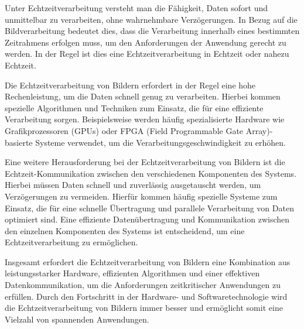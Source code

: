     Unter Echtzeitverarbeitung versteht man die Fähigkeit, Daten sofort und unmittelbar zu verarbeiten, ohne wahrnehmbare Verzögerungen.
    In Bezug auf die Bildverarbeitung bedeutet dies, dass die Verarbeitung innerhalb eines bestimmten Zeitrahmens erfolgen muss, um den Anforderungen der Anwendung gerecht zu werden.
    In der Regel ist dies eine Echtzeitverarbeitung in Echtzeit oder nahezu Echtzeit.
    
    Die Echtzeitverarbeitung von Bildern erfordert in der Regel eine hohe Rechenleistung, um die Daten schnell genug zu verarbeiten.
    Hierbei kommen spezielle Algorithmen und Techniken zum Einsatz, die für eine effiziente Verarbeitung sorgen.
    Beispielsweise werden häufig spezialisierte Hardware wie Grafikprozessoren (GPUs) oder FPGA (Field Programmable Gate Array)-basierte Systeme verwendet, um die Verarbeitungsgeschwindigkeit zu erhöhen.
    
    Eine weitere Herausforderung bei der Echtzeitverarbeitung von Bildern ist die Echtzeit-Kommunikation zwischen den verschiedenen Komponenten des Systems.
    Hierbei müssen Daten schnell und zuverlässig ausgetauscht werden, um Verzögerungen zu vermeiden. Hierfür kommen häufig spezielle Systeme zum Einsatz, die für eine schnelle Übertragung und parallele Verarbeitung von Daten optimiert sind.
    Eine effiziente Datenübertragung und Kommunikation zwischen den einzelnen Komponenten des Systems ist entscheidend, um eine Echtzeitverarbeitung zu ermöglichen.
    
    Insgesamt erfordert die Echtzeitverarbeitung von Bildern eine Kombination aus leistungsstarker Hardware, effizienten Algorithmen und einer effektiven Datenkommunikation, um die Anforderungen zeitkritischer Anwendungen zu erfüllen.
    Durch den Fortschritt in der Hardware- und Softwaretechnologie wird die Echtzeitverarbeitung von Bildern immer besser und ermöglicht somit eine Vielzahl von spannenden Anwendungen.
    
